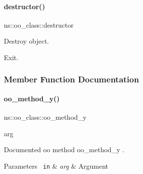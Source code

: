 \paragraph{\texorpdfstring{destructor()}{destructor()}}
{\footnotesize\ttfamily ns\+::oo\+\_\+class\+::destructor}



Destroy object. 

Exit. 
\begin{DoxyCode}{0}

\end{DoxyCode}


\subsubsection{Member Function Documentation}
\mbox{\label{classns_1_1oo__class_ad07feb192f34010ed66d123338c7acdd}} 
\paragraph{\texorpdfstring{oo\_method\_y()}{oo\_method\_y()}}
{\footnotesize\ttfamily ns\+::oo\+\_\+class\+::oo\+\_\+method\+\_\+y\begin{DoxyParamCaption}\item[{}]{arg  }\end{DoxyParamCaption}\hspace{0.3cm}{\ttfamily [protected]}}



Documented oo method {\ttfamily oo\+\_\+method\+\_\+y} . 


\begin{DoxyParams}[1]{Parameters}
\mbox{\texttt{ in}}  & {\em arg} & Argument \\
\hline
\end{DoxyParams}

\begin{DoxyCode}{0}

\end{DoxyCode}
\mbox{\label{classns_1_1oo__class_a8a3cfbae3b3fca463f08adb9174a5fe8}} 
